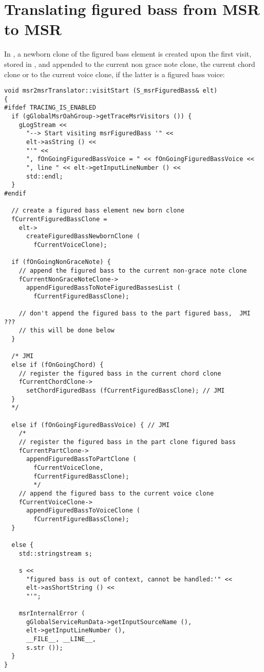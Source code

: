 \section{Translating figured bass from MSR to MSR}

In , a newborn clone of the figured bass element is created upon the first visit, stored in , and appended to the current non grace note clone, the current chord clone or to the current voice clone, if the latter is a figured bass voice: %
\begin{lstlisting}[language=CPlusPlus]
void msr2msrTranslator::visitStart (S_msrFiguredBass& elt)
{
#ifdef TRACING_IS_ENABLED
  if (gGlobalMsrOahGroup->getTraceMsrVisitors ()) {
    gLogStream <<
      "--> Start visiting msrFiguredBass '" <<
      elt->asString () <<
      "'" <<
      ", fOnGoingFiguredBassVoice = " << fOnGoingFiguredBassVoice <<
      ", line " << elt->getInputLineNumber () <<
      std::endl;
  }
#endif

  // create a figured bass element new born clone
  fCurrentFiguredBassClone =
    elt->
      createFiguredBassNewbornClone (
        fCurrentVoiceClone);

  if (fOnGoingNonGraceNote) {
    // append the figured bass to the current non-grace note clone
    fCurrentNonGraceNoteClone->
      appendFiguredBassToNoteFiguredBassesList (
      	fCurrentFiguredBassClone);

    // don't append the figured bass to the part figured bass,  JMI ???
    // this will be done below
  }

  /* JMI
  else if (fOnGoingChord) {
    // register the figured bass in the current chord clone
    fCurrentChordClone->
      setChordFiguredBass (fCurrentFiguredBassClone); // JMI
  }
  */

  else if (fOnGoingFiguredBassVoice) { // JMI
    /*
    // register the figured bass in the part clone figured bass
    fCurrentPartClone->
      appendFiguredBassToPartClone (
        fCurrentVoiceClone,
        fCurrentFiguredBassClone);
        */
    // append the figured bass to the current voice clone
    fCurrentVoiceClone->
      appendFiguredBassToVoiceClone (
        fCurrentFiguredBassClone);
  }

  else {
    std::stringstream s;

    s <<
      "figured bass is out of context, cannot be handled:'" <<
      elt->asShortString () <<
      "'";

    msrInternalError (
      gGlobalServiceRunData->getInputSourceName (),
      elt->getInputLineNumber (),
      __FILE__, __LINE__,
      s.str ());
  }
}
\end{lstlisting}

